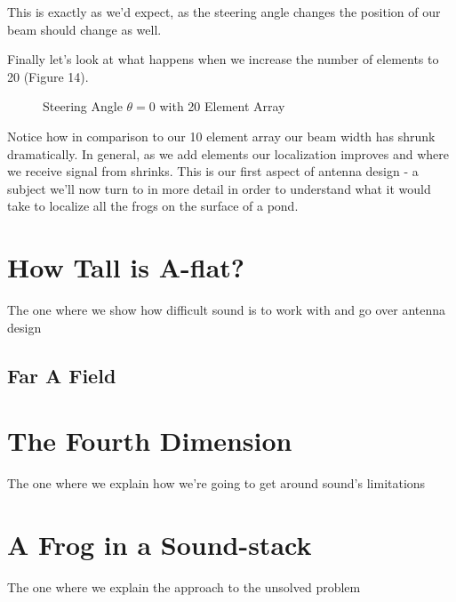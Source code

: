 \documentclass[10pt,a4paper]{article}
\begin{document}
This is exactly as we'd expect, as the steering angle changes the position of our beam should change as well. 

Finally let's look at what happens when we increase the number of elements to 20 (Figure 14).

\begin{figure}[!htb]
\caption{\label{fig:my-label} Steering Angle $\theta=0$ with 20 Element Array}
\end{figure}

Notice how in comparison to our 10 element array our beam width has shrunk dramatically. In general, as we add elements our localization improves and where we receive signal from shrinks. This is our first aspect of antenna design - a subject we'll now turn to in more detail in order to understand what it would take to localize all the frogs on the surface of a pond. 

\newpage


\section{How Tall is A-flat?}
The one where we show how difficult sound is to work with and go over antenna design

\subsection{Far A Field}
\section{The Fourth Dimension}
The one where we explain how we're going to get around sound's limitations
\section{A Frog in a Sound-stack}
The one where we explain the approach to the unsolved problem
\end{document}
